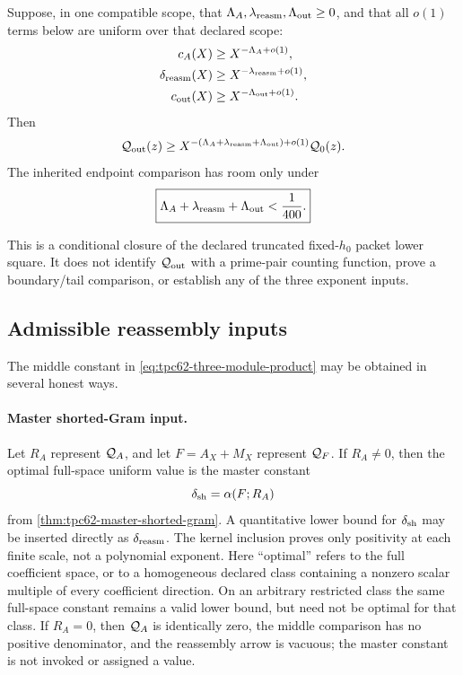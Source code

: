 Suppose, in one compatible scope, that
\(\Lambda_A,\lambda_{\rm reasm},\Lambda_{\rm out}\ge0\), and that all
\(o(1)\) terms below are uniform over that declared scope:
\begin{align}
 c_A(X)&\ge X^{-\Lambda_A+o(1)},
 \label{eq:tpc62-cA-exponent}\\
 \delta_{\rm reasm}(X)&\ge X^{-\lambda_{\rm reasm}+o(1)},
 \label{eq:tpc62-reassembly-exponent}\\
 c_{\rm out}(X)&\ge X^{-\Lambda_{\rm out}+o(1)}.
 \label{eq:tpc62-cout-exponent}
\end{align}
Then
\begin{equation}
 \mathcal Q_{\rm out}(z)
 \ge
 X^{-(\Lambda_A+\lambda_{\rm reasm}+\Lambda_{\rm out})+o(1)}
 \mathcal Q_0(z).
 \label{eq:tpc62-three-module-exponent-product}
\end{equation}
The inherited endpoint comparison has room only under
\begin{equation}
 \boxed{
 \Lambda_A+\lambda_{\rm reasm}+\Lambda_{\rm out}
 <\frac1{400}.}
 \label{eq:tpc62-three-module-endpoint}
\end{equation}

This is a conditional closure of the declared truncated fixed-\(h_0\)
packet lower square.  It does not identify \(\mathcal Q_{\rm out}\) with a
prime-pair counting function, prove a boundary/tail comparison, or establish
any of the three exponent inputs.

\subsection{Admissible reassembly inputs}

The middle constant in
\eqref{eq:tpc62-three-module-product} may be obtained in several honest
ways.

\paragraph{Master shorted-Gram input.}
Let \(R_A\) represent \(\mathcal Q_A\), and let \(F=A_X+M_X\) represent
\(\mathcal Q_F\).  If \(R_A\ne0\), then the optimal full-space uniform value is
the master constant
\begin{equation}
 \delta_{\rm sh}
 =\alpha(F;R_A)
 \label{eq:tpc62-delta-short-input}
\end{equation}
from \cref{thm:tpc62-master-shorted-gram}.  A quantitative lower bound for
\(\delta_{\rm sh}\) may be inserted directly as
\(\delta_{\rm reasm}\).  The kernel inclusion proves only positivity at
each finite scale, not a polynomial exponent.  Here ``optimal'' refers to
the full coefficient space, or to a homogeneous declared class containing a
nonzero scalar multiple of every coefficient direction.  On an arbitrary
restricted class the same full-space constant remains a valid lower bound,
but need not be optimal for that class.
If \(R_A=0\), then \(\mathcal Q_A\) is identically zero, the middle comparison
has no positive denominator, and the reassembly arrow is vacuous; the
master constant is not invoked or assigned a value.

